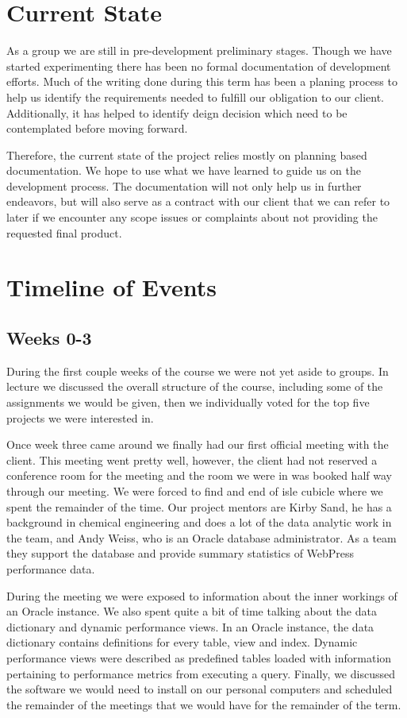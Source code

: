 \documentclass[draftclsnofoot, onecolumn, compsoc, 10pt]{IEEEtran}
\begin{document}
\section{Current State}
As a group we are still in pre-development preliminary stages.
Though we have started experimenting there has been no formal documentation of development efforts.
Much of the writing done during this term has been a planing process to help us identify the requirements needed to fulfill our obligation to our client.
Additionally, it has helped to identify deign decision which need to be contemplated before moving forward.

Therefore, the current state of the project relies mostly on planning based documentation. We hope to use what we have learned to guide us on the development process.
The documentation will not only help us in further endeavors, but will also serve as a contract with our client that we can refer to later if we encounter any scope issues or complaints about not providing the requested final product.

\section{Timeline of Events}
\subsection{Weeks 0-3}
During the first couple weeks of the course we were not yet aside to groups.
In lecture we discussed the overall structure of the course, including some of the assignments we would be given, then we individually voted for the top five projects we were interested in.

Once week three came around we finally had our first official meeting with the client.
This meeting went pretty well, however, the client had not reserved a conference room for the meeting and the room we were in was booked half way through our meeting.
We were forced to find and end of isle cubicle where we spent the remainder of the time.
Our project mentors are Kirby Sand, he has a background in chemical engineering and does a lot of the data analytic work in the team, and Andy Weiss, who is an Oracle database administrator.
As a team they support the database and provide summary statistics of WebPress performance data.

During the meeting we were exposed to information about the inner workings of an Oracle instance.
We also spent quite a bit of time talking about the data dictionary and dynamic performance views.
In an Oracle instance, the data dictionary contains definitions for every table, view and index.
Dynamic performance views were described as predefined tables loaded with information pertaining to performance metrics from executing a query.
Finally, we discussed the software we would need to install on our personal computers and scheduled the remainder of the meetings that we would have for the remainder of the term.
\end{document}
